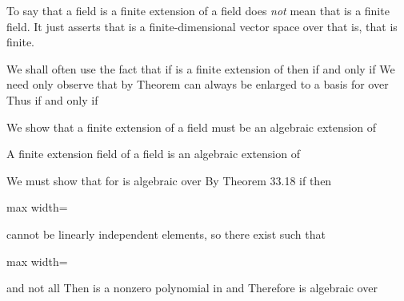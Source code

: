 \documentclass[11pt,oneside]{article}
\begin{document}
\begin{BookBody}

To say that a field  is a finite extension of a field  does\textit{ not} mean that  is a finite field. It just asserts that  is a finite-dimensional vector space over  that is, that \BookInline{[E:F]} is finite.

We shall often use the fact that if  is a finite extension of  then if and only if  We need only observe that by Theorem  can always be enlarged to a basis for  over  Thus  if and only if 

We show that a finite extension  of a field  must be an algebraic extension of 

 A finite extension field  of a field  is an algebraic extension of 

 We must show that for  is algebraic over  By Theorem 33.18 if  then 

\begin{center}\begin{adjustbox}{max width=\linewidth}\end{adjustbox}\end{center}

\noindent cannot be linearly independent elements, so there exist  such that

\begin{center}\begin{adjustbox}{max width=\linewidth}\end{adjustbox}\end{center}

\noindent and not all  Then  is a nonzero polynomial in  and  Therefore\BookInline{,\allowbreak \alpha } is algebraic over \BookEnd{\blacklozenge}


\end{BookBody}
\end{document}
